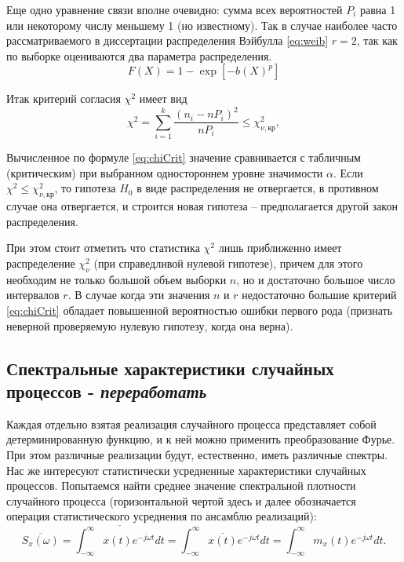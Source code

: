 Еще одно уравнение связи вполне очевидно: сумма всех вероятностей $P_i$ равна 1 или некоторому числу меньшему 1 (но известному). Так в случае наиболее часто рассматриваемого в диссертации распределения Вэйбулла \eqref{eq:weib} $r=2$, так как по выборке оцениваются два параметра распределения.
\begin{equation} \label{eq:weib}
F(X)=1-\exp \left[-b\left(X \right)^{p} \right]
\end{equation}

Итак критерий согласия $\chi^2$ имеет вид
\begin{equation}\label{eq:chiCrit}
  \chi^2=\sum\limits_{i=1}^k\frac{(n_i-nP_i)^2}{nP_i}\le\chi_{\nu,кр}^2,
\end{equation}

Вычисленное по формуле \eqref{eq:chiCrit} значение сравнивается с табличным (критическим) при выбранном одностороннем уровне значимости $\alpha$. Если $\chi^2\le\chi_{\nu,кр}^2$, то гипотеза $H_0$ в виде распределения не отвергается, в противном случае она отвергается, и строится новая гипотеза -- предполагается другой закон распределения.

При этом стоит отметить что статистика $\chi^2$ лишь приближенно имеет распределение $\chi^2_{\nu}$ (при справедливой нулевой гипотезе), причем для этого необходим не только большой объем выборки $n$, но и достаточно большое число интервалов $r$. В случае когда эти значения $n$ и $r$ недостаточно большие критерий \eqref{eq:chiCrit} обладает повышенной вероятностью ошибки первого рода  (признать неверной проверяемую нулевую гипотезу, когда она верна).

\subsection{ Спектральные характеристики случайных процессов - \emph{переработать}}

Каждая отдельно взятая реализация случайного процесса представляет собой детерминированную функцию, и к ней можно применить преобразование Фурье. При этом различные реализации будут, естественно, иметь различные спектры. Нас же интересуют статистически усредненные характеристики случайных процессов. Попытаемся найти среднее значение спектральной плотности случайного процесса (горизонтальной чертой здесь и далее обозначается операция статистического усреднения по ансамблю реализаций):
\begin{equation} \label{GrindEQ__1_5_1_}
\overline{S_{x} (\omega )}=\overline{\int _{-\infty }^{\infty }x(t)e^{-j\omega t} dt }=\int _{-\infty }^{\infty }\overline{x(t)}e^{-j\omega t} dt =\int _{-\infty }^{\infty }m_{x} (t)e^{-j\omega t} dt .
\end{equation}

